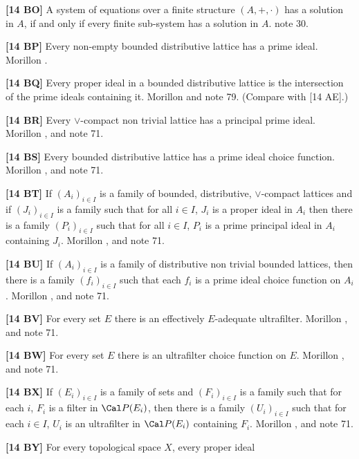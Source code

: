 \smallskip
\item{}{\bf [14 BO]} A system of equations over a finite structure
$(A,+,\cdot)$ has a solution in $A$, if and only if every finite
sub-system has a solution in $A$. note 30.
\smallskip
\item{}{\bf [14 BP]} Every non-empty bounded distributive lattice has a
prime ideal.  \ac{Morillon} \cite{1988}.
\smallskip
\item{}{\bf [14 BQ]} Every proper ideal in a bounded distributive lattice
is the intersection of the prime ideals containing it. \ac{Morillon}
\cite{1988} and note 79. (Compare with [14 AE].)
\smallskip
\item{}{\bf [14 BR]}  Every $\lor$-compact non trivial lattice has a
principal prime ideal.  \ac{Morillon} \cite{1988}, \cite{1985} and note 71.
\smallskip
\item{}{\bf [14 BS]} Every bounded distributive lattice has a prime ideal
choice function.  \ac{Morillon} \cite{1988}, \cite{1985} and note 71.
\smallskip
\item{}{\bf [14 BT]} If $(A_i)_{i\in I}$ is a family of bounded,
distributive, $\lor$-compact lattices and if $(J_i)_{i\in I}$ is a family
such that for all $i\in I$, $J_i$ is a proper ideal in $A_i$ then there
is a family $(P_i)_{i\in I}$ such that for all $i\in I$, $P_i$ is a prime
principal ideal in $A_i$ containing $J_i$.  \ac{Morillon} \cite{1985},
\cite{1988} and note 71.
\smallskip
\item{}{\bf [14 BU]} If $(A_i)_{i\in I}$ is a family of distributive non
trivial bounded lattices, then there is a family $(f_i)_{i\in I}$ such that
each $f_i$ is a prime ideal choice function on $A_i$.  \ac{Morillon}
\cite{1985}, \cite{1988} and note 71.
\smallskip
\item{}{\bf [14 BV]} For every set $E$ there is an effectively
$E$-adequate ultrafilter.  \ac{Morillon} \cite{1988}, \cite{1985} and
note 71.
\smallskip
\item{}{\bf [14 BW]} For every set $E$ there is an ultrafilter choice
function on $E$.  \ac{Morillon} \cite{1985}, \cite{1988} and note 71.
\smallskip
\item{}{\bf [14 BX]} If $(E_i)_{i\in I}$ is a family of sets and $
(F_i)_{i\in I}$ is a family such that for each $i$, $F_i$ is a filter
in $\Cal P(E_i)$, then there is a family $(U_i)_{i\in I}$ such that for
each $i\in I$, $U_i$ is an ultrafilter in $\Cal P(E_i)$ containing $F_i$.
\ac{Morillon} \cite{1985}, \cite{1988} and note 71.
\smallskip
\item{}{\bf [14 BY]} For every topological space $X$, every proper ideal
